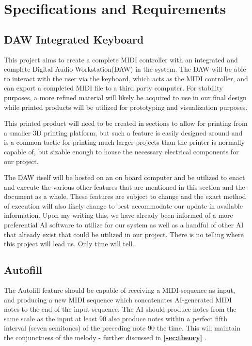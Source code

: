 \section{Specifications and Requirements}

\subsection{DAW Integrated Keyboard}

This project aims to create a complete MIDI controller with an integrated and complete
Digital Audio Workstation(DAW) in the system. The DAW will be able to interact with the
user via the keyboard, which acts as the MIDI controller, and can export a completed MIDI
file to a third party computer. For stability purposes, a more refined material will
likely be acquired to use in our final design while printed products will be utilized for
prototyping and visualization purposes.

This printed product will need to be created in sections to allow for printing from a
smaller 3D printing platform, but such a feature is easily designed around and is a common
tactic for printing much larger projects than the printer is normally capable of, but
sizable enough to house the necessary electrical components for our project.

The DAW itself will be hosted on an on board computer and be utilized to enact and execute
the various other features that are mentioned in this section and the document as a whole.
These features are subject to change and the exact method of execution will also likely
change to best accommodate our update in available information. Upon my writing this, we
have already been informed of a more preferential AI software to utilize for our system as
well as a handful of other AI that already exist that could be utilized in our project.
There is no telling where this project will lead us. Only time will tell.

\subsection{Autofill}

The Autofill feature should be capable of receiving a MIDI sequence as input, and producing
a new MIDI sequence which concatenates AI-generated MIDI notes to the end of the input sequence.
The AI should produce notes from the same scale as the input at least 90%
also produce notes within a perfect fifth interval (seven semitones) of the preceding note 90%
the time. This will maintain the conjunctness of the melody - further discussed in \textbf{\ref{sec:theory} }.

